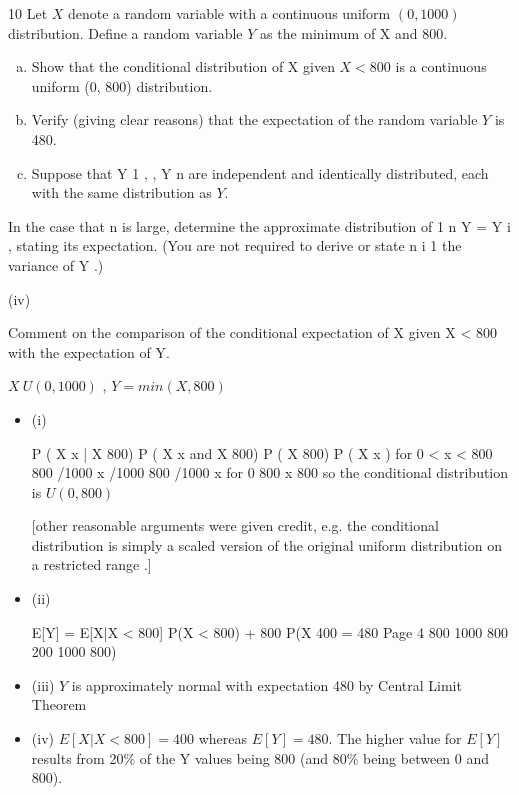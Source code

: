 \documentclass[a4paper,12pt]{article}
\begin{document}
10
Let $X$ denote a random variable with a continuous uniform $(0, 1000)$ distribution. Define a random variable $Y$ as the minimum of X and 800.

\begin{enumerate}[(a)]
\item Show that the conditional distribution of X given $X < 800$ is a continuous uniform (0, 800) distribution.
\item Verify (giving clear reasons) that the expectation of the random variable $Y$ is 480.
\item Suppose that Y 1 , , Y n are independent and identically distributed, each with the same distribution as $Y$.
\end{enumerate}
In the case that n is large, determine the approximate distribution of
1 n
Y =
Y i , stating its expectation. (You are not required to derive or state
n i 1
the variance of Y .)

(iv)

Comment on the comparison of the conditional expectation of X given X < 800 with the expectation of Y.

\newpage

$X ~ U(0,1000)$ , $Y = min(X,800)$

\begin{itemize}
\item (i)

P ( X
x | X
800)
P ( X
x and X 800)
P ( X 800)
P ( X x )
for 0 < x < 800
800 /1000
x /1000
800 /1000
x
for 0
800
x 800
so the conditional distribution is $U(0,800)$

[other reasonable arguments were given credit, e.g. the conditional distribution is simply a scaled version of the original uniform distribution on a restricted range .]

\item 
(ii)

E[Y] = E[X|X < 800] P(X < 800) + 800 P(X
400
= 480
Page 4
800
1000
800
200
1000
800)

\item 
(iii) $Y$ is approximately normal with expectation 480 by Central Limit Theorem

\item (iv) $E[X | X < 800] = 400$ whereas $E[Y] = 480$.
The higher value for $E[Y]$ results from 20\% of the Y values being 800 (and 80\% being between 0 and 800).
\end{itemize}
\end{document}

